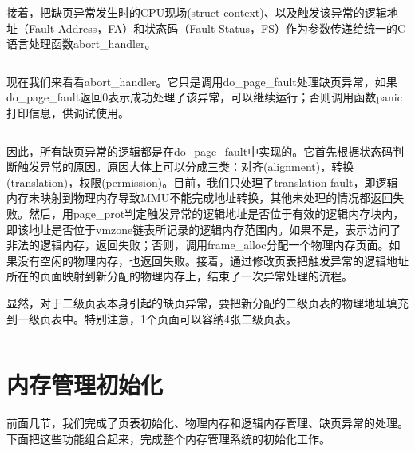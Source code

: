 \documentclass[main.tex]{subfiles}
\begin{document}
\begin{CJK*}{UTF8}{song}
\par
接着，把缺页异常发生时的CPU现场(struct context)、以及触发该异常的逻辑地址（Fault Address，FA）和状态码（Fault Status，FS）作为参数传递给统一的C语言处理函数abort\_handler。

\begin{code}
\label{code:4-19}
\inputminted[firstline=157,lastline=178,linenos,numbersep=5pt,frame=lines,framesep=2mm]{gas}{src/chapter04/kernel/entry.S}
\end{code}

现在我们来看看abort\_handler。它只是调用do\_page\_fault处理缺页异常，如果do\_page\_fault返回0表示成功处理了该异常，可以继续运行；否则调用函数panic打印信息，供调试使用。

\begin{code}
\label{code:4-20}
\inputminted[firstline=329,lastline=335,linenos,numbersep=5pt,frame=lines,framesep=2mm]{c}{src/chapter04/kernel/machdep.c}
\end{code}

因此，所有缺页异常的逻辑都是在do\_page\_fault中实现的。它首先根据状态码判断触发异常的原因。原因大体上可以分成三类：对齐(alignment)，转换(translation)，权限(permission)。目前，我们只处理了translation fault，即逻辑内存未映射到物理内存导致MMU不能完成地址转换，其他未处理的情况都返回失败。然后，用page\_prot判定触发异常的逻辑地址是否位于有效的逻辑内存块内，即该地址是否位于vmzone链表所记录的逻辑内存范围内。如果不是，表示访问了非法的逻辑内存，返回失败；否则，调用frame\_alloc分配一个物理内存页面。如果没有空闲的物理内存，也返回失败。接着，通过修改页表把触发异常的逻辑地址所在的页面映射到新分配的物理内存上，结束了一次异常处理的流程。

\par
显然，对于二级页表本身引起的缺页异常，要把新分配的二级页表的物理地址填充到一级页表中。特别注意，1个页面可以容纳4张二级页表。

\begin{code}
\label{code:4-21}
\inputminted[firstline=256,lastline=327,linenos,numbersep=5pt,frame=lines,framesep=2mm]{c}{src/chapter04/kernel/machdep.c}
\end{code}

\section{内存管理初始化}
前面几节，我们完成了页表初始化、物理内存和逻辑内存管理、缺页异常的处理。下面把这些功能组合起来，完成整个内存管理系统的初始化工作。


\end{CJK*}
\end{document}
